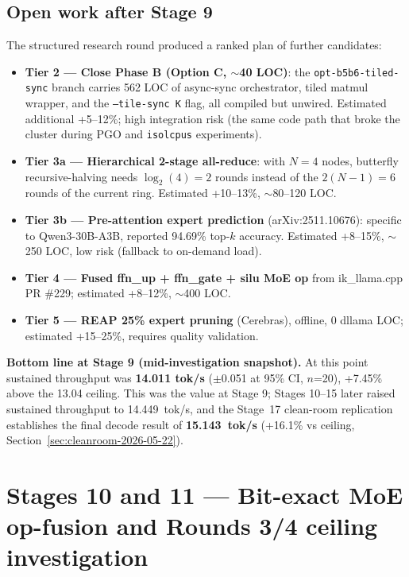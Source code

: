 \documentclass[10pt,a4paper]{article}
\begin{document}
\subsection{Open work after Stage 9}

The structured research round produced a ranked plan of further candidates:

\begin{itemize}
  \item \textbf{Tier 2 --- Close Phase B (Option C, $\sim$40 LOC)}: the \texttt{opt-b5b6-tiled-sync} branch carries 562 LOC of async-sync orchestrator, tiled matmul wrapper, and the \texttt{--tile-sync K} flag, all compiled but unwired. Estimated additional +5--12\%; high integration risk (the same code path that broke the cluster during PGO and \texttt{isolcpus} experiments).
  \item \textbf{Tier 3a --- Hierarchical 2-stage all-reduce}: with $N=4$ nodes, butterfly recursive-halving needs $\log_2(4)=2$ rounds instead of the $2(N-1)=6$ rounds of the current ring. Estimated +10--13\%, $\sim$80--120 LOC.
  \item \textbf{Tier 3b --- Pre-attention expert prediction} (arXiv:2511.10676): specific to Qwen3-30B-A3B, reported 94.69\% top-$k$ accuracy. Estimated +8--15\%, $\sim$250 LOC, low risk (fallback to on-demand load).
  \item \textbf{Tier 4 --- Fused ffn\_up + ffn\_gate + silu MoE op} from ik\_llama.cpp PR \#229; estimated +8--12\%, $\sim$400 LOC.
  \item \textbf{Tier 5 --- REAP 25\% expert pruning} (Cerebras), offline, 0 dllama LOC; estimated +15--25\%, requires quality validation.
\end{itemize}

\textbf{Bottom line at Stage 9 (mid-investigation snapshot).} At this point sustained throughput was \textbf{14.011 tok/s} ($\pm$0.051 at 95\% CI, $n$=20), +7.45\% above the 13.04 ceiling. This was the value at Stage 9; Stages 10--15 later raised sustained throughput to 14.449~tok/s, and the Stage~17 clean-room replication establishes the final decode result of \textbf{15.143~tok/s} (+16.1\% vs ceiling, Section~\ref{sec:cleanroom-2026-05-22}).



\section{Stages 10 and 11 --- Bit-exact MoE op-fusion and Rounds 3/4 ceiling investigation}
\label{sec:stage10_11}
\end{document}
